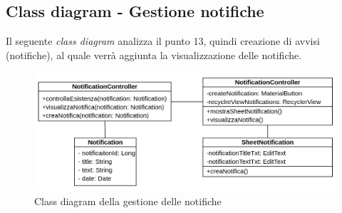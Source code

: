 \subsection{Class diagram - Gestione notifiche}
Il seguente \textit{class diagram} analizza il punto 13, quindi creazione di avvisi (notifiche), al quale verrà aggiunta la visualizzazione delle notifiche.
\begin{figure}[H]
  \centering
  \includegraphics[scale=0.5]{img/class_diagrams/gestioneNotifiche_class_diagram.png}
  \caption{Class diagram della gestione delle notifiche}
\end{figure}
